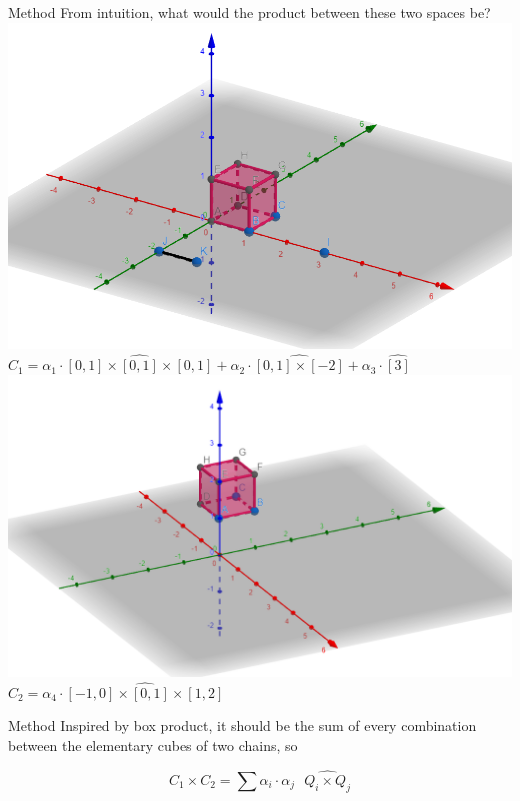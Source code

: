 \documentclass[aspectratio=169,xcolor=dvipsnames]{beamer}
\begin{document}
\begin{frame}{Method}
From intuition, what would the product between these two spaces be? \\
\includegraphics[scale=0.2]{1}     $C_1 = \alpha_1 \cdot \widehat{[0,1] \times [0,1] \times [0,1]} + \alpha_2 \cdot \widehat{[0,1] \times [-2]} + \alpha_3 \cdot \widehat{[3]} $
\includegraphics[scale=0.2]{2}     $C_2 = \alpha_4 \cdot \widehat{[-1,0] \times [0,1] \times [1,2]}$  


\end{frame}


\begin{frame}{Method}
Inspired by box product, it should be the sum of every combination between the elementary cubes of two chains, so
    \begin{function}
        $$C_1 \times C_2 = \sum \alpha_i \cdot \alpha_j \textbf{ }\widehat{Q_i \times Q_j}$$
    \end{function}
\end{frame}
\end{document}
